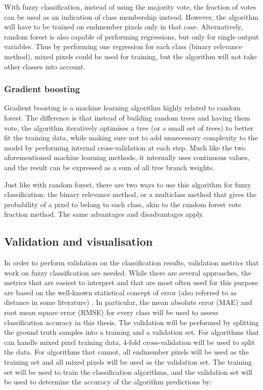 \documentclass[a4paper,10pt]{book}
\begin{document}
With fuzzy classification, instead of using the majority vote, the fraction of votes can be used as an indication of class membership instead. However, the algorithm will have to be trained on endmember pixels only in that case. Alternatively, random forest is also capable of performing regressions, but only for single output variables. Thus by performing one regression for each class (binary relevance method), mixed pixels could be used for training, but the algorithm will not take other classes into account.

\subsubsection{Gradient boosting}

Gradient boosting is a machine learning algorithm highly related to random forest. The difference is that instead of building random trees and having them vote, the algorithm iteratively optimises a tree (or a small set of trees) to better fit the training data, while making sure not to add unnecessary complexity to the model by performing internal cross-validation at each step. Much like the two aforementioned machine learning methods, it internally uses continuous values, and the result can be expressed as a sum of all tree branch weights. \citep{friedman2001gradientboost}

Just like with random forest, there are two ways to use this algorithm for fuzzy classification: the binary relevance method, or a multiclass method that gives the probability of a pixel to belong to each class, akin to the random forest vote fraction method. The same advantages and disadvantages apply.

\subsection{Validation and visualisation}

In order to perform validation on the classification results, validation metrics that work on fuzzy classification are needed. While there are several approaches, the metrics that are easiest to interpret and that are most often used for this purpose are based on the well-known statistical concept of error (also referred to as distance in some literature) \citep{foody1996fuzzyevaluation}. In particular, the mean absolute error (MAE) and root mean square error (RMSE) for every class will be used to assess classification accuracy in this thesis. The validation will be performed by splitting the ground truth samples into a training and a validation set. For algorithms that can handle mixed pixel training data, 4-fold cross-validation will be used to split the data. For algorithms that cannot, all endmember pixels will be used as the training set and all mixed pixels will be used as the validation set. The training set will be used to train the classification algorithms, and the validation set will be used to determine the accuracy of the algorithm predictions by:
\end{document}
